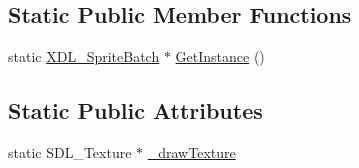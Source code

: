 \subsection*{Static Public Member Functions}
\begin{DoxyCompactItemize}
\item 
static \hyperlink{class_x_d_l___sprite_batch}{X\-D\-L\-\_\-\-Sprite\-Batch} $\ast$ \hyperlink{class_x_d_l___sprite_batch_a1a5318ca5a0a82603f96453793afa6d0}{Get\-Instance} ()
\end{DoxyCompactItemize}
\subsection*{Static Public Attributes}
\begin{DoxyCompactItemize}
\item 
static S\-D\-L\-\_\-\-Texture $\ast$ \hyperlink{class_x_d_l___sprite_batch_a37476782380898a316c9bb7a09aeee0d}{\-\_\-draw\-Texture}
\end{DoxyCompactItemize}


